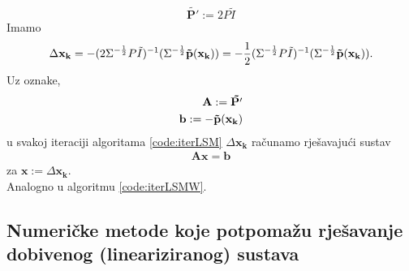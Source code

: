 \documentclass[a4paper,twoside,12pt]{memoir} %
\begin{document}
$$ \mathbf{\tilde{P'}}:= 2 P\tilde{I} $$
Imamo $$
\Delta \mathbf{x_k} = -(2 \Sigma^{-\frac{1}{2}} P\tilde{I} )^{-1}(\Sigma^{-\frac{1}{2}}\mathbf{\tilde{p}}(\mathbf{x_k}))
\\= -\frac{1}{2}(\Sigma^{-\frac{1}{2}} P\tilde{I} )^{-1}(\Sigma^{-\frac{1}{2}}\mathbf{\tilde{p}}(\mathbf{x_k})).
$$
Uz oznake,  
\begin{align}
\mathbf{A} := \mathbf{\tilde{P'}} \notag\\
\mathbf{b} := - \mathbf{\tilde{p}}(\mathbf{x_k}) \notag \\
\end{align}
u svakoj iteraciji algoritama \ref{code:iterLSM}
$\Delta \mathbf{x_k}$ računamo rješavajući sustav
\begin{align}\label{eq:drugaFakt}
\mathbf{A} \mathbf{x} = \mathbf{b}
\end{align}
za $\mathbf{x}:= \Delta \mathbf{x_k}$.
\\
Analogno u algoritmu \ref{code:iterLSMW}.

\subsection{Numeričke metode koje potpomažu rješavanje dobivenog (lineariziranog) sustava}
\end{document}
